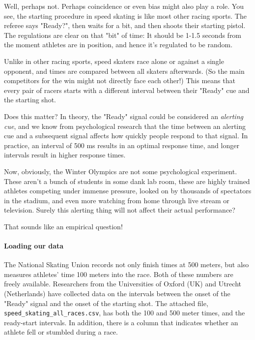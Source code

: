 \documentclass[11pt]{article}
\begin{document}
Well, perhaps not. Perhaps coincidence or even bias might also play a
role. You see, the starting procedure in speed skating is like most
other racing sports. The referee says "Ready?", then waits for a bit,
and then shoots their starting pistol. The regulations are clear on that
"bit" of time: It should be 1-1.5 seconds from the moment athletes are
in position, and hence it's regulated to be random.

Unlike in other racing sports, speed skaters race alone or against a
single opponent, and times are compared between all skaters afterwards.
(So the main competitors for the win might not directly face each
other!) This means that every pair of racers starts with a different
interval between their "Ready" cue and the starting shot.

Does this matter? In theory, the "Ready" signal could be considered an
\emph{alerting cue}, and we know from psychological research that the
time between an alerting cue and a subsequent signal affects how quickly
people respond to that signal. In practice, an interval of 500 ms
results in an optimal response time, and longer intervals result in
higher response times.

Now, obviously, the Winter Olympics are not some psychological
experiment. These aren't a bunch of students in some dank lab room,
these are highly trained athletes competing under immense pressure,
looked on by thousands of spectators in the stadium, and even more
watching from home through live stream or television. Surely this
alerting thing will not affect their actual performance?

That sounds like an empirical question!

\paragraph{Loading our data}\label{loading-our-data}

The National Skating Union records not only finish times at 500 meters,
but also measures athletes' time 100 meters into the race. Both of these
numbers are freely available. Researchers from the Universities of
Oxford (UK) and Utrecht (Netherlands) have collected data on the
intervals between the onset of the "Ready" signal and the onset of the
starting shot. The attached file,
\texttt{speed\_skating\_all\_races.csv}, has both the 100 and 500 meter
times, and the ready-start intervals. In addition, there is a column
that indicates whether an athlete fell or stumbled during a race.
\end{document}
